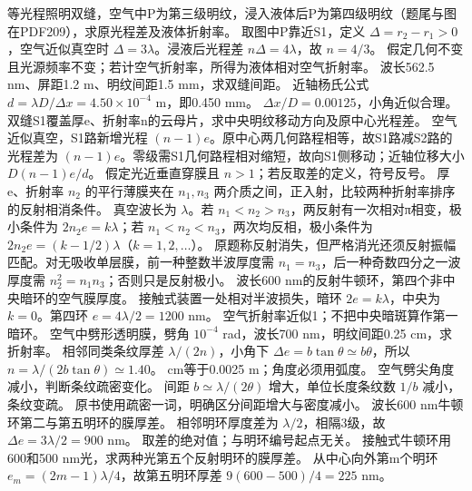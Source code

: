 \problemtext 等光程照明双缝，空气中P为第三级明纹，浸入液体后P为第四级明纹（题尾与图在PDF209），求原光程差及液体折射率。
\workings 取图中P靠近S1，定义 $\Delta=r_2-r_1>0$，空气近似真空时 $\Delta=3\lambda$。浸液后光程差 $n\Delta=4\lambda$，故 $n=4/3$。
\crosscheck 假定几何不变且光源频率不变；若计空气折射率，所得为液体相对空气折射率。
\problemtext 波长562.5 nm、屏距1.2 m、明纹间距1.5 mm，求双缝间距。
\workings 近轴杨氏公式 $d=\lambda D/\Delta x=4.50\times10^{-4}$ m，即0.450 mm。
\crosscheck $\Delta x/D=0.00125$，小角近似合理。
\problemtext 双缝S1覆盖厚e、折射率n的云母片，求中央明纹移动方向及原中心光程差。
\workings 空气近似真空，S1路新增光程 $(n-1)e$。原中心两几何路程相等，故S1路减S2路的光程差为 $(n-1)e$。零级需S1几何路程相对缩短，故向S1侧移动；近轴位移大小 $D(n-1)e/d$。
\crosscheck 假定光近垂直穿膜且 $n>1$；若反取差的定义，符号反号。
\problemtext 厚e、折射率 $n_2$ 的平行薄膜夹在 $n_1,n_3$ 两介质之间，正入射，比较两种折射率排序的反射相消条件。
\workings 真空波长为 $\lambda$。若 $n_1<n_2>n_3$，两反射有一次相对π相变，极小条件为 $2n_2e=k\lambda$；若 $n_1<n_2<n_3$，两次均反相，极小条件为 $2n_2e=(k-1/2)\lambda$（$k=1,2,\ldots$）。
\crosscheck 原题称反射消失，但严格消光还须反射振幅匹配。对无吸收单层膜，前一种整数半波厚度需 $n_1=n_3$，后一种奇数四分之一波厚度需 $n_2^2=n_1n_3$；否则只是反射极小。
\problemtext 波长600 nm的反射牛顿环，第四个非中央暗环的空气膜厚度。
\workings 接触式装置一处相对半波损失，暗环 $2e=k\lambda$，中央为 $k=0$。第四环 $e=4\lambda/2=1200$ nm。
\crosscheck 空气折射率近似1；不把中央暗斑算作第一暗环。
\problemtext 空气中劈形透明膜，劈角 $10^{-4}$ rad，波长700 nm，明纹间距0.25 cm，求折射率。
\workings 相邻同类条纹厚差 $\lambda/(2n)$，小角下 $\Delta e=b\tan\theta\simeq b\theta$，所以 $n=\lambda/(2b\tan\theta)\simeq1.40$。
 cm等于0.0025 m；角度必须用弧度。
\problemtext 空气劈尖角度减小，判断条纹疏密变化。
\workings 间距 $b\simeq\lambda/(2\theta)$ 增大，单位长度条纹数 $1/b$ 减小，条纹变疏。
\crosscheck 原书使用疏密一词，明确区分间距增大与密度减小。
\problemtext 波长600 nm牛顿环第二与第五明环的膜厚差。
\workings 相邻明环厚度差为 $\lambda/2$，相隔3级，故 $\Delta e=3\lambda/2=900$ nm。
\crosscheck 取差的绝对值；与明环编号起点无关。
\problemtext 接触式牛顿环用600和500 nm光，求两种光第五个反射明环的膜厚差。
\workings 从中心向外第m个明环 $e_m=(2m-1)\lambda/4$，故第五明环厚差 $9(600-500)/4=225$ nm。
